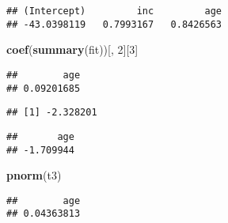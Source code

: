 \documentclass[
]{article}
\newenvironment{Shaded}{\begin{snugshade}}{\end{snugshade}}
\newcommand{\DataTypeTok}[1]{\textcolor[rgb]{0.13,0.29,0.53}{#1}}
\newcommand{\DecValTok}[1]{\textcolor[rgb]{0.00,0.00,0.81}{#1}}
\newcommand{\FloatTok}[1]{\textcolor[rgb]{0.00,0.00,0.81}{#1}}
\newcommand{\KeywordTok}[1]{\textcolor[rgb]{0.13,0.29,0.53}{\textbf{#1}}}
\newcommand{\NormalTok}[1]{#1}
\newcommand{\OperatorTok}[1]{\textcolor[rgb]{0.81,0.36,0.00}{\textbf{#1}}}
\newcommand{\StringTok}[1]{\textcolor[rgb]{0.31,0.60,0.02}{#1}}
\begin{document}
\begin{verbatim}
## (Intercept)         inc         age 
## -43.0398119   0.7993167   0.8426563
\end{verbatim}

\begin{Shaded}
\begin{Highlighting}[]
\KeywordTok{coef}\NormalTok{(}\KeywordTok{summary}\NormalTok{(fit))[, }\DecValTok{2}\NormalTok{][}\DecValTok{3}\NormalTok{] }
\end{Highlighting}
\end{Shaded}

\begin{verbatim}
##        age 
## 0.09201685
\end{verbatim}

\begin{Shaded}
\end{Shaded}

\begin{verbatim}
## [1] -2.328201
\end{verbatim}

\begin{Shaded}
\end{Shaded}

\begin{verbatim}
##       age 
## -1.709944
\end{verbatim}

\begin{Shaded}
\begin{Highlighting}[]
\KeywordTok{pnorm}\NormalTok{(t3)}
\end{Highlighting}
\end{Shaded}

\begin{verbatim}
##        age 
## 0.04363813
\end{verbatim}
\end{document}

